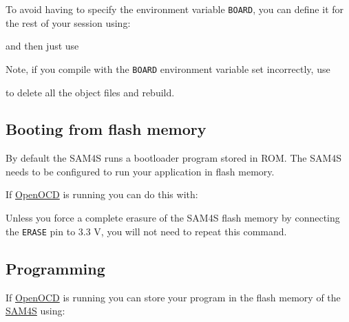 To avoid having to specify the environment variable \texttt{BOARD}, you
can define it for the rest of your session using:
%
\begin{Shaded}
\begin{Highlighting}[]
\NormalTok{$ } 
\end{Highlighting}
\end{Shaded}
%
and then just use
%
\begin{Shaded}
\begin{Highlighting}[]
\NormalTok{$ }
\end{Highlighting}
\end{Shaded}

Note, if you compile with the \texttt{BOARD} environment variable set incorrectly, use
\begin{Shaded}
\begin{Highlighting}[]
\NormalTok{$ }
\NormalTok{$ }  
\end{Highlighting}
\end{Shaded}
%
to delete all the object files and rebuild.


\subsection{Booting from flash memory}
\label{booting-from-flash-memory}

By default the SAM4S runs a bootloader program stored in ROM. The SAM4S
needs to be configured to run your application in flash memory.

If \url{OpenOCD} is running you can do this with:

\begin{Shaded}
\begin{Highlighting}[]
\NormalTok{$ }
\end{Highlighting}
\end{Shaded}

Unless you force a complete erasure of the SAM4S flash memory by
connecting the \texttt{ERASE} pin to 3.3 V, you will not need to repeat
this command.

\subsection{Programming}
\label{programming}

If \url{OpenOCD} is running you can store your program in the flash
memory of the \url{SAM4S} using:

